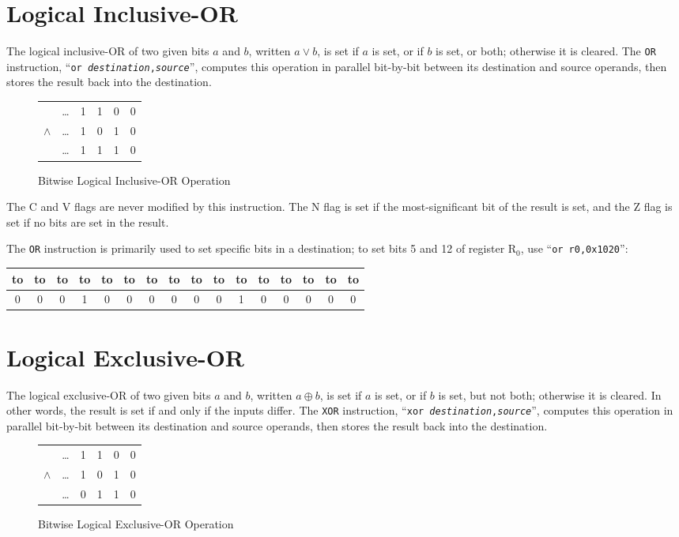 \documentclass[12pt,english]{book}
\newcommand*{\encoding}[1]{\noindent
\begin{tabular}{|c|c|c|c|c|c|c|c|c|c|c|c|c|c|c|c|}
\multicolumn{1}{c}{\hbox to \wd\boxa{\hss 15\hss}}&
\multicolumn{1}{c}{\hbox to \wd\boxa{\hss 14\hss}}&
\multicolumn{1}{c}{\hbox to \wd\boxa{\hss 13\hss}}&
\multicolumn{1}{c}{\hbox to \wd\boxa{\hss 12\hss}}&
\multicolumn{1}{c}{\hbox to \wd\boxa{\hss 11\hss}}&
\multicolumn{1}{c}{\hbox to \wd\boxa{\hss 10\hss}}&
\multicolumn{1}{c}{\hbox to \wd\boxa{\hss 9\hss}}&
\multicolumn{1}{c}{\hbox to \wd\boxa{\hss 8\hss}}&
\multicolumn{1}{c}{\hbox to \wd\boxa{\hss 7\hss}}&
\multicolumn{1}{c}{\hbox to \wd\boxa{\hss 6\hss}}&
\multicolumn{1}{c}{\hbox to \wd\boxa{\hss 5\hss}}&
\multicolumn{1}{c}{\hbox to \wd\boxa{\hss 4\hss}}&
\multicolumn{1}{c}{\hbox to \wd\boxa{\hss 3\hss}}&
\multicolumn{1}{c}{\hbox to \wd\boxa{\hss 2\hss}}&
\multicolumn{1}{c}{\hbox to \wd\boxa{\hss 1\hss}}&
\multicolumn{1}{c}{\hbox to \wd\boxa{\hss 0\hss}}\\\hline
#1\\\hline
\end{tabular}}
\begin{document}
\section{Logical Inclusive-OR}
The logical inclusive-OR of two given bits \(a\) and \(b\),
written \(a\vee b\),
is set if \(a\) is set, or if \(b\) is set, or both;
otherwise it is cleared.
The \texttt{OR} instruction,
``\texttt{or \textit{destination},\textit{source}}'',
computes this operation in parallel
bit-by-bit between its destination and source operands,
then stores the result back into the destination.

\begin{figure}[ht!]\centering
  \begin{tabular}{cccccc}
              &\dots&1&1&0&0\\
    \(\wedge\)&\dots&1&0&1&0\\\cline{2-6}
              &\dots&1&1&1&0
  \end{tabular}
  \caption{Bitwise Logical Inclusive-OR Operation}
  \label{fig:or}
\end{figure}

The C and V flags are never modified by this instruction.
The N flag is set if the most-significant bit of the result is set,
and the Z flag is set if no bits are set in the result.

The \texttt{OR} instruction is primarily used to set specific bits
in a destination;
to set bits 5 and 12 of register \(\text{R}_0\),
use ``\texttt{or r0,0x1020}'':
\begin{center}
\encoding{0&0&0&1&0&0&0&0&0&0&1&0&0&0&0&0}
\end{center}

\section{Logical Exclusive-OR}
The logical exclusive-OR of two given bits \(a\) and \(b\),
written \(a\oplus b\),
is set if \(a\) is set, or if \(b\) is set, but not both;
otherwise it is cleared.
In other words, the result is set if and only if the inputs differ.
The \texttt{XOR} instruction,
``\texttt{xor \textit{destination},\textit{source}}'',
computes this operation in parallel
bit-by-bit between its destination and source operands,
then stores the result back into the destination.

\begin{figure}[ht!]\centering
  \begin{tabular}{cccccc}
              &\dots&1&1&0&0\\
    \(\wedge\)&\dots&1&0&1&0\\\cline{2-6}
              &\dots&0&1&1&0
  \end{tabular}
  \caption{Bitwise Logical Exclusive-OR Operation}
  \label{fig:xor}
\end{figure}
\end{document}
